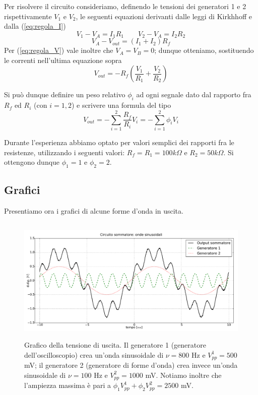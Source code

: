 Per risolvere il circuito consideriamo, definendo le tensioni dei generatori 1 e 2 rispettivamente $V_1$ e $V_2$, le seguenti equazioni derivanti dalle leggi di Kirkhhoff e dalla (\ref{eq:regola_I})
$$V_1 - V_A =I_1 R_1 \qquad V_2 - V_A =I_2 R_2$$
$$V_A - V_{out} =(I_1+I_2) R_f$$
Per (\ref{eq:regola_V}) vale inoltre che $V_A=V_B=0$; dunque otteniamo, sostituendo le correnti nell'ultima equazione sopra
$$V_{out}=-R_f \left( \frac{V_1}{R_1}+\frac{V_2}{R_2}\right)$$

Si può dunque definire un peso relativo $\phi_i$ ad ogni segnale dato dal rapporto fra $R_f$ ed $R_{i}$ (con $i=1,2$) e scrivere una formula del tipo
$$V_{out}=-\sum^{2}_{i=1} \frac{R_f}{R_{i}}V_{i}=-\sum^{2}_{i=1} \phi_i V_{i}$$

Durante l'esperienza abbiamo optato per valori semplici dei rapporti fra le resistenze, utilizzando i seguenti valori: $R_f=R_1=100 k\Omega$ e $R_2=50 k\Omega$. Si ottengono dunque $\phi_1=1$ e $\phi_2=2$.

\subsection{Grafici}

Presentiamo ora i grafici di alcune forme d'onda in uscita.

$$$$

\begin{figure}[ht]
 \centering
   {\includegraphics[width=16.5cm]{../E01/latex/sinsin.pdf}}
 \caption{Grafico della tensione di uscita. Il generatore 1 (generatore dell'oscilloscopio) crea un'onda sinusoidale di $\nu=800$ \si{\hertz} e $V^1_{pp}=500$ \si{\milli\volt}; il generatore 2 (generatore di forme d'onda) crea invece un'onda sinusoidale di $\nu=100$ \si{\hertz} e $V^2_{pp}=1000$ \si{\milli\volt}. Notiamo inoltre che l'ampiezza massima è pari a $\phi_1 V^1_{pp}+\phi_2 V^2_{pp}=2500$ \si{\milli\volt}.}
 \label{gr:onde1}
\end{figure}

